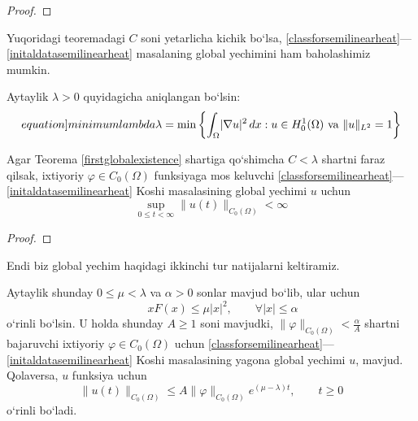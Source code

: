 \begin{proof}
    
\end{proof}

\begin{remark}
    Yuqoridagi teoremadagi $C$ soni yetarlicha kichik bo`lsa, \eqref{classforsemilinearheat}---\eqref{initaldatasemilinearheat} masalaning global yechimini ham baholashimiz mumkin.
\end{remark}

Aytaylik $\lambda>0$ quyidagicha aniqlangan bo`lsin:
\begin{equation}\label[equation]{minimumlambda}
    \lambda=\min \left\{\int_{\Omega}\lvert\nabla u\rvert^2\,dx : u\in H_0^1(\Omega) \text{ va } \lVert u\rVert _{L^2}=1 \right\}
\end{equation}
\begin{theorem}
    Agar Teorema \ref{firstglobalexistence} shartiga qo`shimcha $C<\lambda$ shartni faraz qilsak, ixtiyoriy $\varphi\in C_0(\Omega)$ funksiyaga mos keluvchi \eqref{classforsemilinearheat}---\eqref{initaldatasemilinearheat} Koshi masalasining global yechimi $u$ uchun 
    \begin{equation*}
        \sup\limits_{0\le t<\infty} \lVert u(t) \rVert _{C_0(\Omega)}<\infty
    \end{equation*} 
\end{theorem}
\begin{proof}
    
\end{proof}

Endi biz global yechim haqidagi ikkinchi tur natijalarni keltiramiz.
\begin{theorem}
    Aytaylik shunday $0\le\mu<\lambda$ va $\alpha>0$ sonlar mavjud bo`lib, ular uchun 
    \begin{equation*}
      \qquad  x F(x)\le \mu \lvert x\rvert ^2,\qquad \forall \lvert x\rvert \le \alpha
    \end{equation*}
    o`rinli bo`lsin. U holda shunday $A\ge 1$ soni mavjudki, $\lVert \varphi \rVert _{C_0(\Omega)}< \frac{\alpha}{A}$ shartni bajaruvchi ixtiyoriy $\varphi \in C_0(\Omega)$ uchun \eqref{classforsemilinearheat}---\eqref{initaldatasemilinearheat} Koshi masalasining yagona global yechimi $u$, mavjud. Qolaversa, $u$ funksiya uchun
    \begin{equation*}
        \lVert u(t)\rVert _{C_0(\Omega)}\le A \lVert \varphi \rVert _{C_0(\Omega)} e^{(\mu-\lambda)t}, \qquad t\ge 0
    \end{equation*} 
    o`rinli bo`ladi.
\end{theorem}